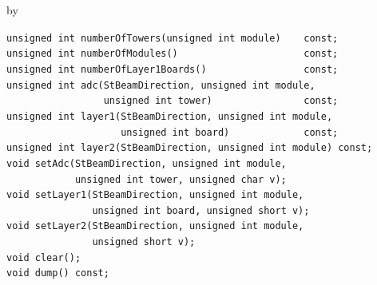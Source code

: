 \documentclass[twoside]{article}
\newcommand{\entrylabel}[1]{\mbox{\textbf{{#1}}}\hfil}%
\newenvironment{entry}
{\begin{list}{}%
    {\renewcommand{\makelabel}{\entrylabel}%
     \setlength{\labelwidth}{90pt}%
     \setlength{\leftmargin}{\labelwidth}
     \advance\leftmargin by \labelsep%
      }%
    }%
  {\end{list}}
\newcommand{\Entrylabel}[1]%
{\raisebox{0pt}[1ex][0pt]{\makebox[\labelwidth][l]%
    {\parbox[t]{\labelwidth}{\hspace{0pt}\textbf{{#1}}}}}}
\newenvironment{Entry}%
{\renewcommand{\entrylabel}{\Entrylabel}\begin{entry}}%
  {\end{entry}}
\begin{document}
\begin{Entry}
\item[Public Member\\ Functions]
    \verb+unsigned int numberOfTowers(unsigned int module)    const;+\\
    \verb+unsigned int numberOfModules()                      const;+\\
    \verb+unsigned int numberOfLayer1Boards()                 const;+\\
    \verb+unsigned int adc(StBeamDirection, unsigned int module,+\\
    \verb+                 unsigned int tower)                const;+\\
    \verb+unsigned int layer1(StBeamDirection, unsigned int module,+\\
    \verb+                    unsigned int board)             const;+\\
    \verb+unsigned int layer2(StBeamDirection, unsigned int module) const;+\\
    \verb+void setAdc(StBeamDirection, unsigned int module,+\\
    \verb+            unsigned int tower, unsigned char v);+\\
    \verb+void setLayer1(StBeamDirection, unsigned int module,+\\
    \verb+               unsigned int board, unsigned short v);+\\
    \verb+void setLayer2(StBeamDirection, unsigned int module,+\\
    \verb+               unsigned short v);+\\
    \verb+void clear();+\\
    \verb+void dump() const;+\\
\end{Entry}
\clearpage

\end{document}
